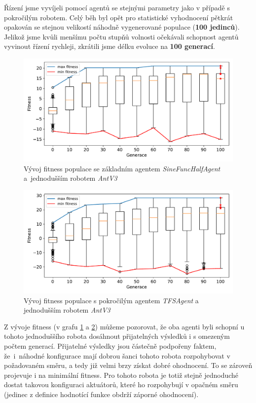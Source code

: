 Řízení jsme vyvíjeli pomocí agentů se stejnými parametry jako v případě s
pokročilým robotem. Celý běh byl opět pro statistické vyhodnocení pětkrát
opakován se stejnou velikostí náhodně vygenerované populace (\textbf{100
jedinců}). Jelikož jsme kvůli menšímu počtu stupňů volnosti očekávali schopnost
agentů vyvinout řízení rychleji, zkrátili jsme délku evoluce na \textbf{100
generací}.

\begin{figure}[h!]
    \centering
    \includegraphics[width=1\textwidth]{../img/experiment1_2_Sine_10ticks.pdf}
    \caption{Vývoj fitness populace se základním agentem
    \emph{SineFuncHalfAgent} a~jednodušším robotem \emph{AntV3}}
    \label{exp:first2_sinefull}
\end{figure}
\begin{figure}[h!]
    \includegraphics[width=1\textwidth]{../img/experiment1_2_TFS_10ticks.pdf}
    \caption{Vývoj fitness populace s pokročilým agentem \emph{TFSAgent} a
    jednodušším robotem \emph{AntV3}}
    \label{exp:first2_TFS}
\end{figure}

Z vývoje fitness (v grafu \ref{exp:first2_sinefull} a \ref{exp:first2_TFS})
můžeme pozorovat, že oba agenti byli schopní u tohoto jednoduššího robota
dosáhnout přijatelných výsledků i s omezeným počtem generací. Přijatelné
výsledky jsou částečně podpořeny faktem, že~i~náhodné konfigurace mají dobrou
šanci tohoto robota rozpohybovat v požadovaném směru, a tedy již velmi brzy
získat dobré ohodnocení. To se zároveň projevuje i na minimální fitness. Pro
tohoto robota je totiž stejně jednoduché dostat takovou konfiguraci aktuátorů,
které ho rozpohybují v opačném směru (jedinec z definice hodnotící funkce
obdrží záporné ohodnocení).

